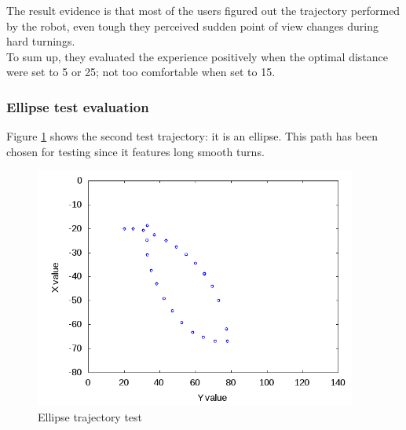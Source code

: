 The result evidence is that most of the users figured out the
trajectory performed by the robot, even tough they perceived
sudden point of view changes during hard turnings.
\\
To sum up, they evaluated the experience positively when the
optimal distance were set to 5 or 25; not too comfortable
when set to 15.


\subsubsection{Ellipse test evaluation}
\label{performance_evaluation:tests_result:ellipsetest}

Figure \ref{fig:ellipsetest} shows the second test trajectory:
it is an ellipse. This path has been chosen for testing since it
features long smooth turns.

\begin{figure}[!h]
  \begin{center}
    \includegraphics[width=300pt]{img/path_session_5.png}
    \caption{Ellipse trajectory test}
    \label{fig:ellipsetest}
  \end{center}
\end{figure}

